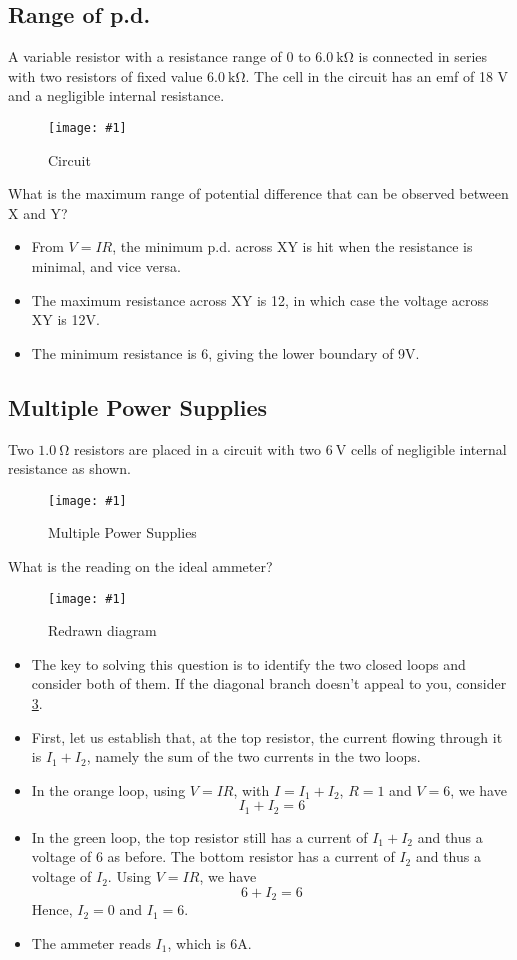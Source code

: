 \documentclass[a4paper,12pt]{article}
\newcommand{\img}[4]{\begin{center}
  \begin{figure}[H]
    \centering
    \texttt{[image: \#1]}
    \caption{#3}
    \label{fig:#4}
  \end{figure}
\end{center}}
\begin{document}
\pagebreak

\subsection{Range of p.d.}

A variable resistor with a resistance range of 0 to $\SI{6.0}{\kilo\ohm}$ is connected in series with two resistors of fixed value $\SI{6.0}{\kilo\ohm}$. The cell in the circuit has an emf of 18 V and a negligible internal resistance.

\img{ex/3.png}{0.7}{Circuit}{ex3}

What is the maximum range of potential difference that can be observed between X and Y?

\begin{itemize}
  \item From $V = IR$, the minimum p.d. across XY is hit when the resistance is minimal, and vice versa.
  \item The maximum resistance across XY is 12, in which case the voltage across XY is 12V.
  \item The minimum resistance is 6, giving the lower boundary of 9V.
\end{itemize}

\pagebreak

\subsection{Multiple Power Supplies}

Two $\SI{1.0}{\ohm}$ resistors are placed in a circuit with two $\SI{6}{\V}$ cells of negligible internal resistance as shown.

\img{ex/4.png}{0.4}{Multiple Power Supplies}{ex4}

What is the reading on the ideal ammeter?

\img{ex/5.png}{0.6}{Redrawn diagram}{ex5}

\begin{itemize}
  \item The key to solving this question is to identify the two closed loops and consider both of them. If the diagonal branch doesn't appeal to you, consider \cref{fig:ex5}.
  \item First, let us establish that, at the top resistor, the current flowing through it is $I_1 + I_2$, namely the sum of the two currents in the two loops.
  \item In the orange loop, using $V = IR$, with $I = I_1 + I_2$, $R = 1$ and $V = 6$, we have $$I_1 + I_2 = 6$$
  \item In the green loop, the top resistor still has a current of $I_1 + I_2$ and thus a voltage of 6 as before. The bottom resistor has a current of $I_2$ and thus a voltage of $I_2$. Using $V = IR$, we have $$6 + I_2 = 6$$
        Hence, $I_2 = 0$ and $I_1 = 6$.
  \item The ammeter reads $I_1$, which is 6A.
\end{itemize}
\end{document}
